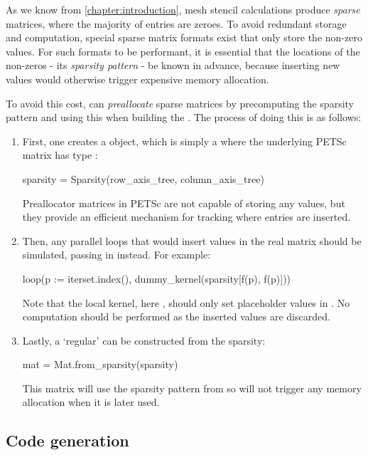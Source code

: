\documentclass[thesis]{subfiles}
\begin{document}
As we know from \cref{chapter:introduction}, mesh stencil calculations produce \emph{sparse} matrices, where the majority of entries are zeroes.
To avoid redundant storage and computation, special sparse matrix formats exist that only store the non-zero values.
For such formats to be performant, it is essential that the locations of the non-zeros - its \emph{sparsity pattern} - be known in advance, because inserting new values would otherwise trigger expensive memory allocation.

To avoid this cost,  can \emph{preallocate} sparse matrices by precomputing the sparsity pattern and using this when building the .
The process of doing this is as follows:
\begin{enumerate}
  \item
    First, one creates a  object, which is simply a   where the underlying PETSc matrix has type :
    \begin{pyinline}
      sparsity = Sparsity(row_axis_tree, column_axis_tree)
    \end{pyinline}
    Preallocator matrices in PETSc are not capable of storing any values, but they provide an efficient mechanism for tracking where entries are inserted.
  \item
    Then, any parallel loops that would insert values in the real matrix should be simulated, passing in  instead.
    For example:
    \begin{pyinline}
      loop(p := iterset.index(), dummy_kernel(sparsity[f(p), f(p)]))
    \end{pyinline}
    Note that the local kernel, here , should only set placeholder values in .
    No computation should be performed as the inserted values are discarded.
  \item
    Lastly, a `regular'  can be constructed from the sparsity:
    \begin{pyinline}
      mat = Mat.from_sparsity(sparsity)
    \end{pyinline}
    This matrix will use the sparsity pattern from  so will not trigger any memory allocation when it is later used.
\end{enumerate}

\subsection{Code generation}
\label{sec:impl_matrices_codegen}
\end{document}
